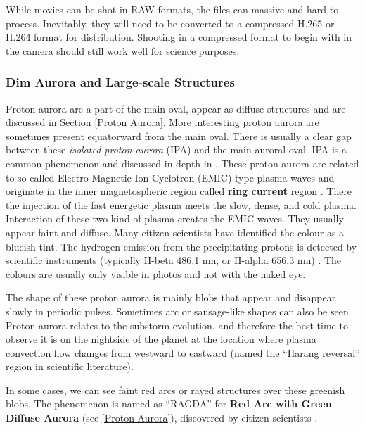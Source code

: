 \documentclass{article}
\renewcommand{\cite}[1]{\parencite{#1}}
\begin{document}
While movies can be shot in RAW formats, the files can massive and hard to process. Inevitably, they will need to be converted to a compressed H.265 or H.264 format for distribution. Shooting in a compressed format to begin with in the camera should still work well for science purposes.

\subsubsection{Dim Aurora and Large-scale Structures}\label{DimAurora}


Proton aurora are a part of the main oval, appear as diffuse structures and are discussed in Section \ref{Proton Aurora}. More interesting proton aurora are sometimes present equatorward from the main oval. There is usually a clear gap between these \textit{isolated proton aurora} (IPA) and the main auroral oval. IPA is a common phenomenon and discussed in depth in \cite{Liang2022}. These proton aurora are related to so-called Electro Magnetic Ion Cyclotron (EMIC)-type plasma waves and originate in the inner magnetospheric region called {\bf ring current} region \cite{Liang2022}. There the injection of the fast energetic plasma meets the slow, dense, and cold plasma. Interaction of these two kind of plasma creates the EMIC waves. They usually appear faint and diffuse. Many citizen scientists have identified the colour as a blueish tint. The hydrogen emission from the precipitating protons is detected by scientific instruments (typically H-beta 486.1 nm, or H-alpha 656.3 nm) \cite{Liang2022}. The colours are usually only visible in photos and not with the naked eye. 

The shape of these proton aurora is mainly blobs that appear and disappear slowly in periodic pulses. Sometimes arc or sausage-like shapes can also be seen. Proton aurora relates to the substorm evolution, and therefore the best time to observe it is on the nightside of the planet at the location where plasma convection flow changes from westward to eastward (named the ``Harang reversal'' region in scientific literature).

In some cases, we can see faint red arcs or rayed structures over these greenish blobs. The phenomenon is named as ``RAGDA'' for {\bf Red Arc with Green Diffuse Aurora} (see \ref{Proton Aurora}), discovered by citizen scientists \cite{Nishimura2022}. 
\end{document}
